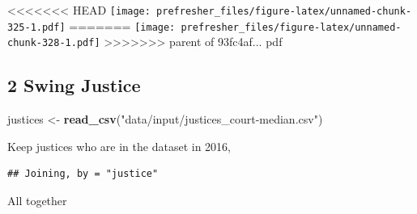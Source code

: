 \documentclass[]{book}
\newenvironment{Shaded}{\begin{snugshade}}{\end{snugshade}}
\newcommand{\CommentTok}[1]{\textcolor[rgb]{0.56,0.35,0.01}{\textit{#1}}}
\newcommand{\DataTypeTok}[1]{\textcolor[rgb]{0.13,0.29,0.53}{#1}}
\newcommand{\DecValTok}[1]{\textcolor[rgb]{0.00,0.00,0.81}{#1}}
\newcommand{\KeywordTok}[1]{\textcolor[rgb]{0.13,0.29,0.53}{\textbf{#1}}}
\newcommand{\NormalTok}[1]{#1}
\newcommand{\OperatorTok}[1]{\textcolor[rgb]{0.81,0.36,0.00}{\textbf{#1}}}
\newcommand{\StringTok}[1]{\textcolor[rgb]{0.31,0.60,0.02}{#1}}
\theoremstyle{definition}
\theoremstyle{definition}
\theoremstyle{definition}
\theoremstyle{remark}
\begin{document}
\begin{Shaded}
\begin{Highlighting}[]
\begin{Shaded}
\begin{Highlighting}[]
\begin{Shaded}
\begin{Highlighting}[]
<<<<<<< HEAD
\texttt{[image: prefresher\_files/figure-latex/unnamed-chunk-325-1.pdf]}
=======
\texttt{[image: prefresher\_files/figure-latex/unnamed-chunk-328-1.pdf]}
>>>>>>> parent of 93fc4af... pdf

\hypertarget{swing-justice}{%
\subsection*{2 Swing Justice}\label{swing-justice}}

\begin{Shaded}
\begin{Highlighting}[]
\NormalTok{justices <-}\StringTok{ }\KeywordTok{read_csv}\NormalTok{(}\StringTok{"data/input/justices_court-median.csv"}\NormalTok{)}
\end{Highlighting}
\end{Shaded}

Keep justices who are in the dataset in 2016,

\begin{Shaded}
\end{Shaded}

\begin{verbatim}
## Joining, by = "justice"
\end{verbatim}

All together


\end{Highlighting}
\end{Shaded}
\end{Highlighting}
\end{Shaded}
\end{Highlighting}
\end{Shaded}
\end{document}

